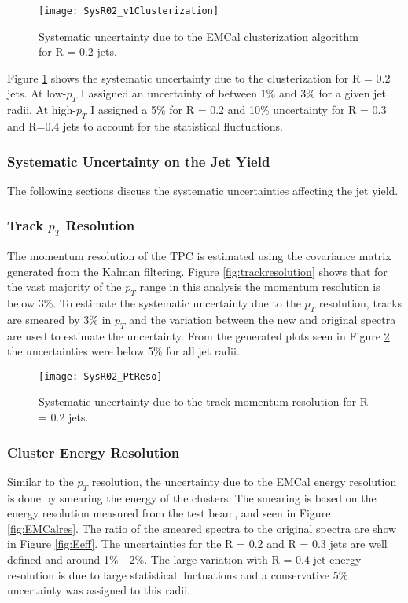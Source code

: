 \begin{figure}[t!]
\texttt{[image: SysR02\_v1Clusterization]}
\centering
\caption{Systematic uncertainty due to the EMCal clusterization algorithm for R = 0.2 jets.}
\label{fig:cluseff}
\end{figure}


Figure \ref{fig:cluseff} shows the systematic uncertainty due to the clusterization for R = 0.2 jets.  At low-$p_{T}$ I assigned an uncertainty of between 1\% and 3\% for a given jet radii.  At high-$p_{T}$ I assigned a 5\% for R = 0.2 and 10\% uncertainty for R = 0.3 and R=0.4 jets to account for the statistical fluctuations.

\subsubsection{Systematic Uncertainty on the Jet Yield}

The following sections discuss the systematic uncertainties affecting the jet yield.

\subsubsection{Track $p_{T}$ Resolution}




The momentum resolution of the TPC is estimated using the covariance matrix generated from the Kalman filtering\cite{Fruhwirth:1987fm}.  Figure \ref{fig:trackresolution} shows that for the vast majority of the $p_{T}$ range in this analysis the  momentum resolution is below 3\%.  To estimate the systematic uncertainty due to the $p_{T}$ resolution, tracks are smeared by 3\% in $p_{T}$ and the variation between the new and original spectra are used to estimate the uncertainty.  From the generated plots seen in Figure \ref{fig:pTeff} the uncertainties were below 5\% for all jet radii.

\begin{figure}[h!]
\texttt{[image: SysR02\_PtReso]}
\centering
\caption{Systematic uncertainty due to the track momentum resolution for R = 0.2 jets.}
\label{fig:pTeff}
\end{figure}

\subsubsection{Cluster Energy Resolution}

Similar to the $p_{T}$ resolution, the uncertainty due to the EMCal energy resolution is done by smearing the energy of the clusters.  The smearing is based on the energy resolution measured from the test beam, and seen in Figure \ref{fig:EMCalres}.  The ratio of the smeared spectra to the original spectra are show in Figure \ref{fig:Eeff}. The uncertainties for the R = 0.2 and R = 0.3 jets are well defined and around 1\% - 2\%.  The large variation with R = 0.4 jet energy resolution is due to large statistical fluctuations and a conservative 5\% uncertainty was assigned to this radii.

